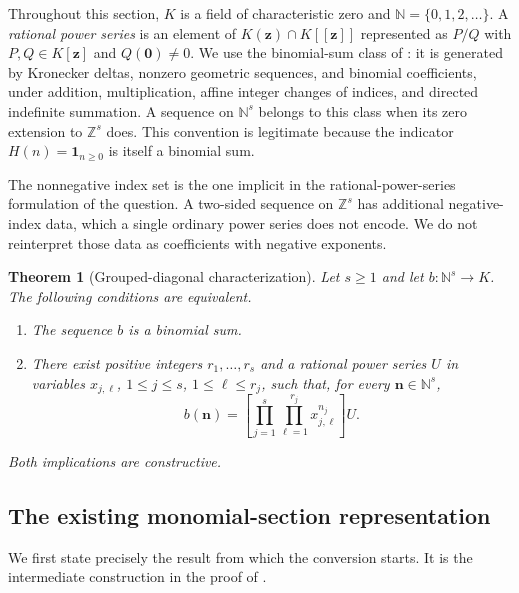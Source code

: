 \documentclass[11pt,a4paper]{article}
\newtheorem{theorem}{Theorem}[section]
\theoremstyle{remark}\newtheorem{remark}[theorem]{Remark}
\begin{document}
Throughout this section, $K$ is a field of characteristic zero and
$\mathbb N=\{0,1,2,\ldots\}$.  A \emph{rational power series} is an element
of $K(\boldsymbol z)\cap K[[\boldsymbol z]]$ represented as $P/Q$ with
$P,Q\in K[\boldsymbol z]$ and $Q(\boldsymbol 0)\ne0$.
We use the binomial-sum class of \cite[Definition~1.1]{BLS2017}: it is
generated by Kronecker deltas, nonzero geometric sequences, and binomial
coefficients, under addition, multiplication, affine integer changes of
indices, and directed indefinite summation.  A sequence on $\mathbb N^s$
belongs to this class when its zero extension to $\mathbb Z^s$ does.
This convention is legitimate because the indicator
$H(n)=\boldsymbol 1_{n\ge0}$ is itself a binomial sum.

The nonnegative index set is the one implicit in the rational-power-series
formulation of the question.  A two-sided sequence on $\mathbb Z^s$ has
additional negative-index data, which a single ordinary power series does
not encode.  We do not reinterpret those data as coefficients with
negative exponents.

\begin{theorem}[Grouped-diagonal characterization]
\label{thm:gd-characterization}
Let $s\ge1$ and let $b\colon\mathbb N^s\longrightarrow K$.
The following conditions are equivalent.
\begin{enumerate}
\item The sequence $b$ is a binomial sum.
\item There exist positive integers $r_1,\ldots,r_s$ and a rational
power series $U$ in variables $x_{j,\ell}$,
$1\le j\le s$, $1\le\ell\le r_j$, such that, for every
$\boldsymbol n\in\mathbb N^s$,
\begin{equation}
 b(\boldsymbol n)=
 \left[\prod_{j=1}^s\prod_{\ell=1}^{r_j}x_{j,\ell}^{n_j}\right]U.
 \label{eq:gd-target}
\end{equation}
\end{enumerate}
Both implications are constructive.
\end{theorem}

\subsection{The existing monomial-section representation}

We first state precisely the result from which the conversion starts.
It is the intermediate construction in the proof of
\cite[Proposition~3.10 and Section~3.1]{BLS2017}.
\end{document}
